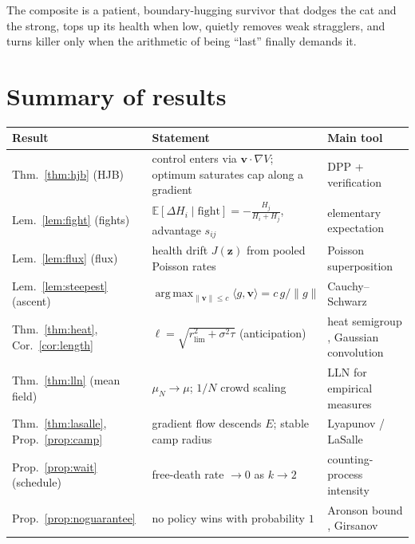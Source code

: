 \documentclass[11pt]{article}
\newcommand{\E}{\mathbb{E}}
\newcommand{\rlim}{r_{\mathrm{lim}}}
\newcommand{\z}{\mathbf{z}}
\newcommand{\vv}{\mathbf{v}}
\DeclareMathOperator*{\argmax}{arg\,max}
\begin{document}
\vspace{0.5em}
The composite is a patient, boundary-hugging survivor that dodges the cat and the
strong, tops up its health when low, quietly removes weak stragglers, and turns
killer only when the arithmetic of being ``last'' finally demands it.

\newpage
\section*{Summary of results}

\renewcommand{\arraystretch}{1.35}
\begin{center}
\begin{tabular}{@{}p{}p{}p{}@{}}
\hline
\textbf{Result} & \textbf{Statement} & \textbf{Main tool} \\
\hline
Thm.~\ref{thm:hjb} (HJB) &
control enters via $\vv\cdot\nabla V$; optimum saturates cap along a gradient &
DPP + verification \cite{FlemingSoner} \\
Lem.~\ref{lem:fight} (fights) &
$\E[\Delta H_i\mid\text{fight}]=-\tfrac{H_j}{H_i+H_j}$, advantage $s_{ij}$ &
elementary expectation \\
Lem.~\ref{lem:flux} (flux) &
health drift $J(\z)$ from pooled Poisson rates &
Poisson superposition \cite{Kingman} \\
Lem.~\ref{lem:steepest} (ascent) &
$\argmax_{\|\vv\|\le c}\langle g,\vv\rangle=c\,g/\|g\|$ &
Cauchy--Schwarz \\
Thm.~\ref{thm:heat}, Cor.~\ref{cor:length} &
$\ell=\sqrt{\rlim^2+\sigma^2\tau}$ (anticipation) &
heat semigroup \cite{KaratzasShreve}, Gaussian convolution \\
Thm.~\ref{thm:lln} (mean field) &
$\mu_N\to\mu$; $1/N$ crowd scaling &
LLN for empirical measures \cite{Varadarajan} \\
Thm.~\ref{thm:lasalle}, Prop.~\ref{prop:camp} &
gradient flow descends $E$; stable camp radius &
Lyapunov / LaSalle \cite{Khalil,LaSalle} \\
Prop.~\ref{prop:wait} (schedule) &
free-death rate $\to0$ as $k\to2$ &
counting-process intensity \\
Prop.~\ref{prop:noguarantee} &
no policy wins with probability $1$ &
Aronson bound \cite{Aronson}, Girsanov \\
\hline
\end{tabular}
\end{center}
\end{document}
